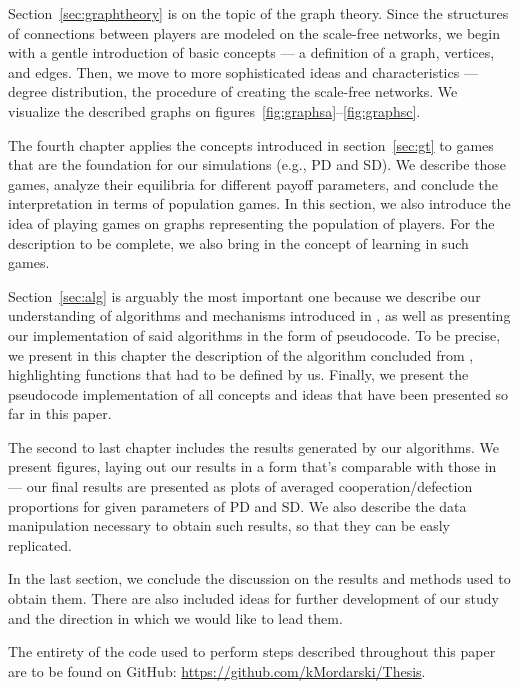 \documentclass[english, twoside, 12pt, a4paper]{article}
\theoremstyle{definition}
\theoremstyle{plain}
\theoremstyle{remark}
\begin{document}
Section~\ref{sec:graphtheory} is on the topic of the graph theory. Since the structures of connections between players are modeled on the scale-free networks, we begin with a gentle introduction of basic concepts --- a definition of a graph, vertices, and edges. Then, we move to more sophisticated ideas and characteristics --- degree distribution, the procedure of creating the scale-free networks. We visualize the described graphs on figures~\ref{fig:graphsa}--\ref{fig:graphsc}.

The fourth chapter applies the concepts introduced in section~\ref{sec:gt} to games that are the foundation for our simulations (e.g., PD and SD). We describe those games, analyze their equilibria for different payoff parameters, and conclude the interpretation in terms of population games. In this section, we also introduce the idea of playing games on graphs representing the population of players. For the description to be complete, we also bring in the concept of learning in such games.

Section~\ref{sec:alg} is arguably the most important one because we describe our understanding of algorithms and mechanisms introduced in \cite{santos2005scale}, as well as presenting our implementation of said algorithms in the form of pseudocode. To be precise, we present in this chapter the description of the algorithm concluded from \cite{santos2005scale}, highlighting functions that had to be defined by us. Finally, we present the pseudocode implementation of all concepts and ideas that have been presented so far in this paper.

The second to last chapter includes the results generated by our algorithms. We present figures, laying out our results in a form that's comparable with those in \cite{santos2005scale} --- our final results are presented as plots of averaged cooperation/defection proportions for given parameters of PD and SD. We also describe the data manipulation necessary to obtain such results, so that they can be easly replicated. 

In the last section, we conclude the discussion on the results and methods used to obtain them. There are also included ideas for further development of our study and the direction in which we would like to lead them. 

The entirety of the code used to perform steps described throughout this paper are to be found on GitHub: 
\url{https://github.com/kMordarski/Thesis}.

\clearpage
\end{document}

